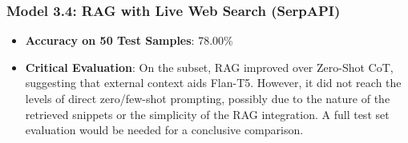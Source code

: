 \documentclass[10.5pt]{article}
\begin{document}
\subsubsection{Model 3.4: RAG with Live Web Search (SerpAPI)}
\begin{itemize}
    \item \textbf{Accuracy on 50 Test Samples}: 78.00\%
    \item \textbf{Critical Evaluation}: On the subset, RAG improved over Zero-Shot CoT, suggesting that external context aids Flan-T5. However, it did not reach the levels of direct zero/few-shot prompting, possibly due to the nature of the retrieved snippets or the simplicity of the RAG integration. A full test set evaluation would be needed for a conclusive comparison.
\end{itemize}

\newpage
\end{document}
